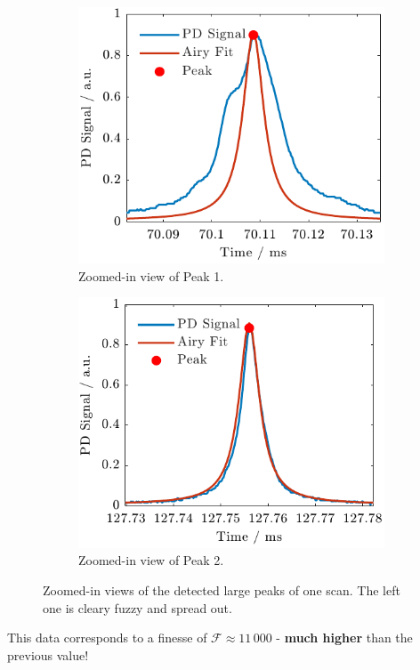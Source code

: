 \documentclass[a4paper,11pt]{article}
\begin{document}
\begin{figure}[H]
    \centering
    \begin{subfigure}[t]{0.48\textwidth}
        \centering
        \includegraphics[width=\textwidth]{twoPiezo/Figure_3.pdf}
        \caption{Zoomed-in view of Peak 1.}
        \label{fig:peak1_0v}
    \end{subfigure}
    \hfill
    \begin{subfigure}[t]{0.48\textwidth}
        \centering
        \includegraphics[width=\textwidth]{twoPiezo/Figure_4.pdf}
        \caption{Zoomed-in view of Peak 2.}
        \label{fig:peak2_0v}
    \end{subfigure}
    \caption{Zoomed-in views of the detected large peaks of one scan. The left one is cleary fuzzy and spread out.}
\end{figure}
This data corresponds to a finesse of $\mathcal{F}\approx11\,000$ - \textbf{much higher} than the previous value!
\newpage
\end{document}
